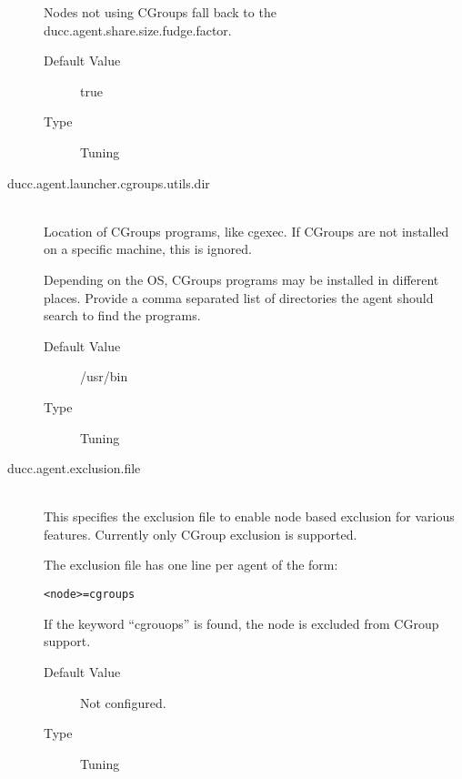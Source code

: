 \begin{description}
            Nodes not using CGroups fall back to the ducc.agent.share.size.fudge.factor.

            \begin{description}
              \item[Default Value] true
              \item[Type] Tuning 
            \end{description}
            
          \item[ducc.agent.launcher.cgroups.utils.dir] \hfill \\
            \label{itm:ducc.agent.launcher.cgroups.utils.dir}
            Location of CGroups programs, like cgexec. If CGroups are not
            installed on a specific machine, this is ignored.

            Depending on the OS, CGroups programs may be installed in different places. 
            Provide a comma separated list of directories the agent should search to find the programs.  

            \begin{description}
              \item[Default Value] /usr/bin
              \item[Type] Tuning 
            \end{description}



          \item[ducc.agent.exclusion.file] \hfill \\
            \label{itm:props-agent.cgroups.exclusion}
            This specifies the exclusion file to enable node based exclusion for various
            features.  Currently only CGroup exclusion is supported.

            The exclusion file has one line per agent of the form:
\begin{verbatim}
<node>=cgroups
\end{verbatim}
            If the keyword ``cgrouops'' is found, the node is excluded from CGroup
            support. 
          
            \begin{description}
              \item[Default Value] Not configured.
              \item[Type] Tuning 
            \end{description}
            

          \end{description}
      

